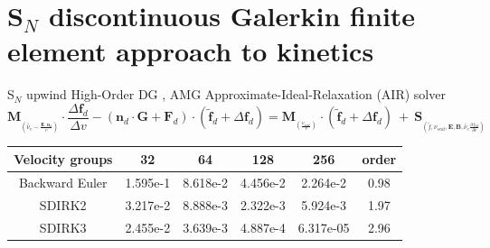 \documentclass[8pt, compress]{beamer}
\newcommand{\pdv}[2]{\frac{\partial{#1}}{\partial{#2}}}
\newcommand{\vect}[1]{\boldsymbol{#1}}
\newcommand{\matr}[1]{\mathbf{#1}}
\newcommand{\nue}{\nu_{e}}
\newcommand{\nuscat}{\nu_{scat}}
\newcommand{\vmag}{v}
\newcommand{\vn}{\vect{n}}
\newcommand{\E}{\vect{E}}
\newcommand{\B}{\vect{B}}
\newcommand{\fM}{f_M}
\newcommand{\fzero}{f_0}
\begin{document}
\section{S$_N$ discontinuous Galerkin finite element approach to kinetics}
\newcommand{\fs}{0.45}

\begin{frame}
\begin{center}
{\Large S$_N$ upwind High-Order DG
    , AMG Approximate-Ideal-Relaxation (AIR) solver
}
\begin{equation}
  \matr{M}_{_{(\tilde{\nue} - \frac{\E\cdot\vn_d}{\vmag})}}\cdot 
  \frac{\Delta \vect{f}_d}{\Delta \vmag}
  -   \left(\vn_d\cdot\matr{G} + \matr{F}_d\right) \cdot 
  \left(\tilde{\vect{f}}_d + \Delta \vect{f}_d\right) 
  =
  \matr{M}_{_{(\frac{\nuscat}{\vmag})}}\cdot 
  \left(\tilde{\vect{f}}_d + \Delta \vect{f}_d\right)
  ~+~ \vect{S}_{_{(\tilde{f}, \nuscat, \E, \B, \tilde{\nue}\pdv{\fM}{\vmag})}}
  \nonumber
\end{equation}

\begin{tabular}{c|ccccc}
    Velocity groups       & 32   & 64 & 128 & 256 & order \\
    \hline
	Backward Euler & 1.595e-1 & 8.618e-2 & 4.456e-2 & 2.264e-2 & 0.98 \\
    SDIRK2         & 3.217e-2 & 8.888e-3 & 2.322e-3 & 5.924e-3 & 1.97 \\
    SDIRK3         & 2.455e-2 & 3.639e-3 & 4.887e-4 & 6.317e-05 & 2.96 \\
\end{tabular}



\end{center}
\end{frame}
\end{document}
